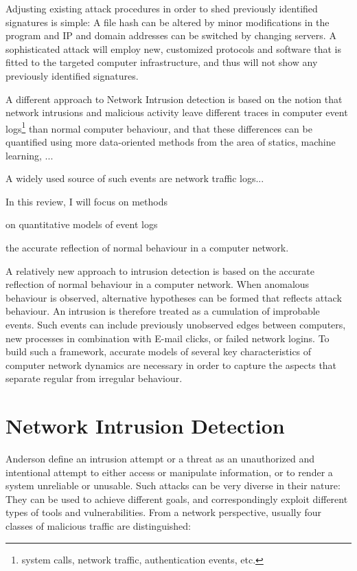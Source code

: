 \documentclass[a4paper,12pt,twoside]{report}
\begin{document}
Adjusting existing attack procedures in order to shed previously identified signatures is simple: A file hash can be altered by minor modifications in the program and IP and domain addresses can be switched by changing servers.
A sophisticated attack will employ new, customized protocols and software that is fitted to the targeted computer infrastructure, and thus will not show any previously identified signatures. 

A different approach to Network Intrusion detection is based on the notion that network intrusions and malicious activity leave different traces in computer event logs\footnote{system calls, network traffic, authentication events, etc.} than normal computer behaviour, and that these differences can be quantified using more data-oriented methods from the area of statics, machine learning, ...

A widely used source of such events are network traffic logs...

In this review, I will focus on methods 

on quantitative models of event logs

the accurate reflection of normal behaviour in a computer network.

A relatively new approach to intrusion detection is based on the accurate reflection of normal behaviour in a computer network. When anomalous behaviour is observed, alternative hypotheses can be formed that reflects attack behaviour. An intrusion is therefore treated as a cumulation of improbable events. Such events can include previously unobserved edges between computers, new processes in combination with E-mail clicks, or failed network logins. To build such a framework, accurate models of several key characteristics of computer network dynamics are necessary in order to capture the aspects that separate regular from irregular behaviour.


\section{Network Intrusion Detection}

Anderson \cite{anderson1980computer} define an intrusion attempt or a threat
as an unauthorized and intentional attempt to either access or manipulate information, or to render a system unreliable or unusable. Such attacks can be very diverse in their nature: They can be used to achieve different goals, and correspondingly exploit different types of tools and vulnerabilities. From a network perspective, usually four classes of malicious traffic are distinguished:
\end{document}
